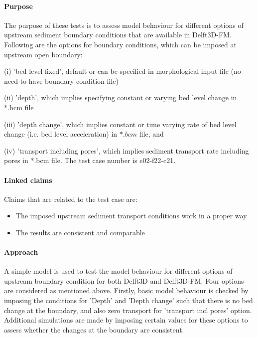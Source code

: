 \label{case:e22-f22-c21}

\paragraph*{Purpose}
The purpose of these tests is to assess model behaviour for different options of upstream sediment boundary conditions that are available in Delft3D-FM. Following are the options for boundary conditions, which can be imposed at upstream open boundary: 

(i) 'bed level fixed', default or can be specified in morphological input file (no need to have boundary condition file)

(ii) 'depth', which implies specifying constant or varying bed level change in *.bcm file 

(iii) 'depth change', which implies constant or time varying rate of bed level change (i.e. bed level acceleration) in $*.bcm$ file, and 

(iv) 'transport including pores', which implies sediment transport rate including pores in *.bcm file. 
The test case number is e02-f22-c21.
\paragraph*{Linked claims}
Claims that are related to the test case are:
\begin{itemize}
\item The imposed upstream sediment transport conditions work in a proper way 
\end{itemize}
\begin{itemize}
	\item The results are consistent and comparable
\end{itemize}

\paragraph*{Approach}
A simple model is used to test the model behaviour for different options of upstream boundary condition for both Delft3D and Delft3D-FM. Four options are considered as mentioned above. Firstly, basic model behaviour is checked by imposing the conditions for 'Depth' and 'Depth change' such that there is no bed change at the boundary, and also zero transport for 'transport incl pores' option. Additional simulations are made by imposing certain values for these options to assess whether the changes at the boundary are consistent.     

